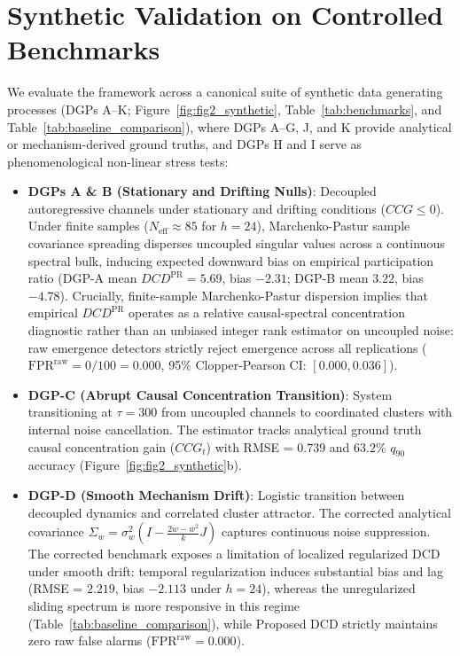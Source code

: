 \documentclass[10pt,twocolumn,journal]{article}
\begin{document}
\section{Synthetic Validation on Controlled Benchmarks}
We evaluate the framework across a canonical suite of synthetic data generating processes (DGPs A--K; Figure~\ref{fig:fig2_synthetic}, Table~\ref{tab:benchmarks}, and Table~\ref{tab:baseline_comparison}), where DGPs A--G, J, and K provide analytical or mechanism-derived ground truths, and DGPs H and I serve as phenomenological non-linear stress tests:
\begin{itemize}[noitemsep,topsep=2pt,parsep=1pt]
    \item \textbf{DGPs A \& B (Stationary and Drifting Nulls)}: Decoupled autoregressive channels under stationary and drifting conditions ($CCG \le 0$). Under finite samples ($N_{\text{eff}} \approx 85$ for $h=24$), Marchenko-Pastur sample covariance spreading disperses uncoupled singular values across a continuous spectral bulk, inducing expected downward bias on empirical participation ratio (DGP-A mean $DCD^{\text{PR}} = 5.69$, bias $-2.31$; DGP-B mean $3.22$, bias $-4.78$). Crucially, finite-sample Marchenko-Pastur dispersion implies that empirical $DCD^{\text{PR}}$ operates as a relative causal-spectral concentration diagnostic rather than an unbiased integer rank estimator on uncoupled noise: raw emergence detectors strictly reject emergence across all replications ($\text{FPR}^{\text{raw}} = 0/100 = 0.000$, 95\% Clopper-Pearson CI: $[0.000, 0.036]$).
    \item \textbf{DGP-C (Abrupt Causal Concentration Transition)}: System transitioning at $\tau=300$ from uncoupled channels to coordinated clusters with internal noise cancellation. The estimator tracks analytical ground truth causal concentration gain ($CCG_t$) with RMSE = $0.739$ and $63.2\%$ $q_{90}$ accuracy (Figure~\ref{fig:fig2_synthetic}b).
    \item \textbf{DGP-D (Smooth Mechanism Drift)}: Logistic transition between decoupled dynamics and correlated cluster attractor. The corrected analytical covariance $\Sigma_w = \sigma_w^2(I - \frac{2w-w^2}{k}J)$ captures continuous noise suppression. The corrected benchmark exposes a limitation of localized regularized DCD under smooth drift: temporal regularization induces substantial bias and lag (RMSE = $2.219$, bias $-2.113$ under $h=24$), whereas the unregularized sliding spectrum is more responsive in this regime (Table~\ref{tab:baseline_comparison}), while Proposed DCD strictly maintains zero raw false alarms ($\text{FPR}^{\text{raw}} = 0.000$).

\end{itemize}
\end{document}
